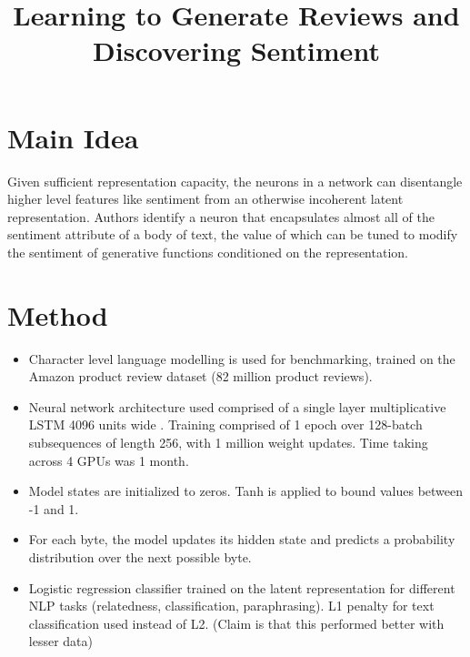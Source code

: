 \documentclass[12pt]{scrartcl}
\begin{document}
\title{Learning to Generate Reviews and Discovering Sentiment}
\author{}
\date{}
\maketitle

\section{Main Idea}
  Given sufficient representation capacity, the neurons in a network can disentangle higher level features like sentiment from an otherwise incoherent latent representation. Authors identify a neuron that encapsulates almost all of the sentiment attribute of a body of text, the value of which can be tuned to modify the sentiment of generative functions conditioned on the representation. \cite{radford2017learning}

\section{Method}
  \begin{itemize}
    \item Character level language modelling is used for benchmarking, trained on the Amazon product review dataset (82 million product reviews).
    \item Neural network architecture used comprised of a single layer multiplicative LSTM 4096 units wide \cite{krause2016multiplicative}. Training comprised of 1 epoch over 128-batch subsequences of length 256, with 1 million weight updates. Time taking across 4 GPUs was 1 month.
    \item Model states are initialized to zeros.  Tanh is applied to bound values between -1 and 1.
    \item For each byte, the model updates its hidden state and predicts a probability distribution over the next possible byte.
    \item Logistic regression classifier trained on the latent representation for different NLP tasks (relatedness, classification, paraphrasing). L1 penalty for text classification used instead of L2. (Claim is that this performed better with lesser data)
  \end{itemize}
\end{document}
